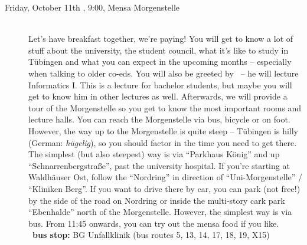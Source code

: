 \begin{description}
\ifml
    \item[Friday, October 11th \YEAR, 9:00, Mensa Morgenstelle]\ \\
        Let's have breakfast together, we're paying! You will get to know a lot of stuff about the university, the student council, what it's like to study in Tübingen and what you can expect in the upcoming months -- especially when talking to older co-eds.
    \ifwintersemester You will also be greeted by \Infoprof~-- he will lecture Informatics I. This is a lecture for bachelor students, but maybe you will get to know him in other lectures as well. \fi
    Afterwards, we will provide a tour of the Morgenstelle so you get to know the most important rooms and lecture halls.
    You can reach the Morgenstelle via bus, bicycle or on foot. However, the way up to the Morgenstelle is quite steep -- Tübingen is hilly (German: \emph{hügelig}), so you should factor in the time you need to get there.
    The simplest (but also steepest) way is via "`Parkhaus König"' and up "`Schnarrenbergstraße"', past the university hospital. If you're starting at Waldhäuser Ost, follow the "`Nordring"' in direction of "`Uni-Morgenstelle"' / "`Kliniken Berg"'.
    If you want to drive there by car, you can park (not free!) by the side of the road on Nordring or inside the multi-story cark park "`Ebenhalde"' north of the Morgenstelle. However, the simplest way is via bus.
    From 11:45 onwards, you can try out the mensa food if you like.\\
    ~\textbf{bus stop:} BG Unfallklinik (bus routes 5, 13, 14, 17, 18, 19, X15)


\end{description}
